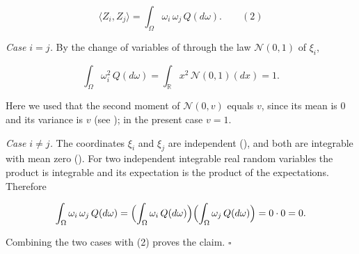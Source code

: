 \documentclass[11pt,a4paper]{article}
\begin{document}
\[\langle Z_i,Z_j\rangle=\int_\Omega\omega_i\,\omega_j\,Q(d\omega).\qquad(2)\]


\emph{Case \(i=j\).} By the change of variables of \cite[Section~3.6.4]{LangevinLean2026ULASC} through the law \(\mathcal N(0,1)\) of \(\xi_i\),


\[\int_\Omega\omega_i^2\,Q(d\omega)=\int_{\mathbb R}x^2\,\mathcal N(0,1)(dx)=1.\]


Here we used that the second moment of \(\mathcal N(0,v)\) equals \(v\), since its mean is \(0\) and its variance is \(v\) (see \cite[Section~3.4.1]{LangevinLean2026ULASC}); in the present case \(v=1\).




\emph{Case \(i\ne j\).} The coordinates \(\xi_i\) and \(\xi_j\) are independent (\cite[Section~3.6.6]{LangevinLean2026ULASC}), and both are integrable with mean zero (\cite[Section~3.6.7]{LangevinLean2026ULASC}). For two independent integrable real random variables the product is integrable and its expectation is the product of the expectations. Therefore


\[\int_\Omega\omega_i\,\omega_j\,Q(d\omega)=\Bigl(\int_\Omega\omega_i\,Q(d\omega)\Bigr)\Bigl(\int_\Omega\omega_j\,Q(d\omega)\Bigr)=0\cdot0=0.\]


Combining the two cases with (2) proves the claim. \(\square\)
\end{document}
